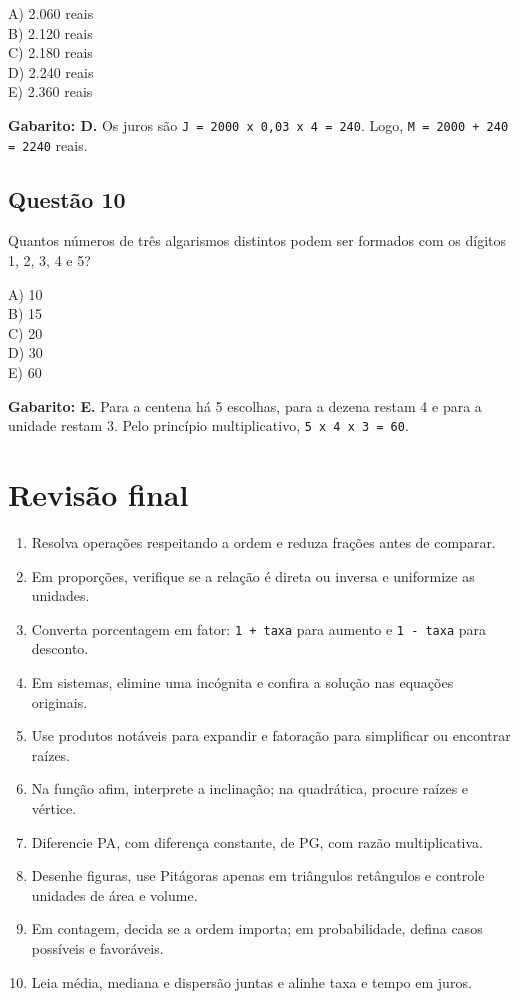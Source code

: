 \documentclass[11pt,a4paper]{article}
\begin{document}
A) 2.060 reais \\ B) 2.120 reais \\ C) 2.180 reais \\ D) 2.240 reais \\ E) 2.360 reais

\begin{alerta}
\textbf{Gabarito: D.} Os juros são \texttt{J = 2000 x 0,03 x 4 = 240}. Logo, \texttt{M = 2000 + 240 = 2240} reais.
\end{alerta}

\subsection*{Questão 10}

Quantos números de três algarismos distintos podem ser formados com os dígitos 1, 2, 3, 4 e 5?

A) 10 \\ B) 15 \\ C) 20 \\ D) 30 \\ E) 60

\begin{alerta}
\textbf{Gabarito: E.} Para a centena há 5 escolhas, para a dezena restam 4 e para  a unidade restam 3. Pelo princípio multiplicativo, \texttt{5 x 4 x 3 = 60}.
\end{alerta}

\section*{Revisão final}

\begin{enumerate}
  \item Resolva operações respeitando a ordem e reduza frações antes de comparar.
  \item Em proporções, verifique se a relação é direta ou inversa e uniformize as unidades.
  \item Converta porcentagem em fator: \texttt{1 + taxa} para aumento e \texttt{1 - taxa} para desconto.
  \item Em sistemas, elimine uma incógnita e confira a solução nas equações originais.
  \item Use produtos notáveis para expandir e fatoração para simplificar ou encontrar raízes.
  \item Na função afim, interprete a inclinação; na quadrática, procure raízes e vértice.
  \item Diferencie PA, com diferença constante, de PG, com razão multiplicativa.
  \item Desenhe figuras, use Pitágoras apenas em triângulos retângulos e controle unidades de área e volume.
  \item Em contagem, decida se a ordem importa; em probabilidade, defina casos possíveis e favoráveis.
  \item Leia média, mediana e dispersão juntas e alinhe taxa e tempo em juros.
\end{enumerate}
\end{document}
